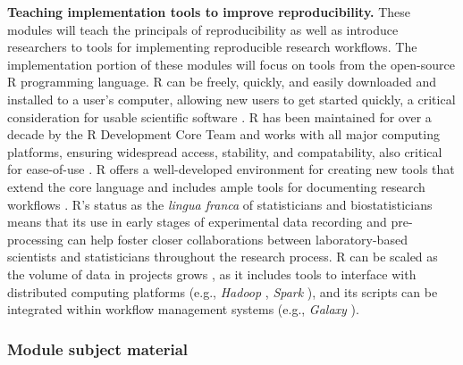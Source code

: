 \documentclass[pdftex,english,11pt,parskip=half]{scrartcl}
\begin{document}
\textbf{Teaching implementation tools to improve reproducibility.} These modules will teach the principals of reproducibility as well as introduce researchers to tools for implementing reproducible research workflows. The implementation portion of these modules will focus on tools from the open-source R programming language. R can be freely, quickly, and easily downloaded and installed to a user's computer, allowing new users to get started quickly, a critical consideration for usable scientific software \cite{list2017ten}. R has been maintained for over a decade by the R Development Core Team and works with all major computing platforms, ensuring  widespread access, stability, and compatability, also critical for ease-of-use \cite{baumer2017lessons, altschul2013anatomy}. R offers a well-developed environment for creating new tools that extend the core language \cite{wickham2015r} and includes ample tools for documenting research workflows \cite{xie2015dynamic, xie2016bookdown}. R's status as the \textit{lingua franca} of statisticians and biostatisticians means that its use in early stages of experimental data recording and pre-processing can help foster closer collaborations between laboratory-based scientists and statisticians throughout the research process. R can be scaled as the volume of data in projects grows \cite{list2017ten}, as it includes tools to interface with distributed computing platforms (e.g., \textit{Hadoop} \cite{pathak2014rhadoop}, \textit{Spark} \cite{sparklyr}), and its scripts can be integrated within workflow management systems (e.g., \textit{Galaxy} \cite{goecks2010galaxy, walker2016models}). 

\subsubsection*{Module subject material}
\end{document}
